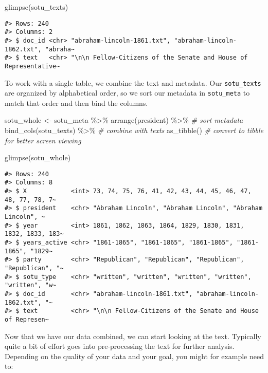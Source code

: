 \documentclass[
]{book}
\newenvironment{Shaded}{\begin{snugshade}}{\end{snugshade}}
\newcommand{\CommentTok}[1]{\textcolor[rgb]{0.56,0.35,0.01}{\textit{#1}}}
\newcommand{\FunctionTok}[1]{\textcolor[rgb]{0.00,0.00,0.00}{#1}}
\newcommand{\NormalTok}[1]{#1}
\newcommand{\OtherTok}[1]{\textcolor[rgb]{0.56,0.35,0.01}{#1}}
\newcommand{\SpecialCharTok}[1]{\textcolor[rgb]{0.00,0.00,0.00}{#1}}
\begin{document}
\begin{Shaded}
\begin{Highlighting}[]
\FunctionTok{glimpse}\NormalTok{(sotu\_texts)}
\end{Highlighting}
\end{Shaded}

\begin{verbatim}
#> Rows: 240
#> Columns: 2
#> $ doc_id <chr> "abraham-lincoln-1861.txt", "abraham-lincoln-1862.txt", "abraha~
#> $ text   <chr> "\n\n Fellow-Citizens of the Senate and House of Representative~
\end{verbatim}

To work with a single table, we combine the text and metadata. Our \texttt{sotu\_texts} are organized by alphabetical order, so we sort our metadata in \texttt{sotu\_meta} to match that order and then bind the columns.

\begin{Shaded}
\begin{Highlighting}[]
\NormalTok{sotu\_whole }\OtherTok{\textless{}{-}} 
\NormalTok{  sotu\_meta }\SpecialCharTok{\%\textgreater{}\%}  
  \FunctionTok{arrange}\NormalTok{(president) }\SpecialCharTok{\%\textgreater{}\%} \CommentTok{\# sort metadata}
  \FunctionTok{bind\_cols}\NormalTok{(sotu\_texts) }\SpecialCharTok{\%\textgreater{}\%} \CommentTok{\# combine with texts}
  \FunctionTok{as\_tibble}\NormalTok{() }\CommentTok{\# convert to tibble for better screen viewing}

\FunctionTok{glimpse}\NormalTok{(sotu\_whole)}
\end{Highlighting}
\end{Shaded}

\begin{verbatim}
#> Rows: 240
#> Columns: 8
#> $ X            <int> 73, 74, 75, 76, 41, 42, 43, 44, 45, 46, 47, 48, 77, 78, 7~
#> $ president    <chr> "Abraham Lincoln", "Abraham Lincoln", "Abraham Lincoln", ~
#> $ year         <int> 1861, 1862, 1863, 1864, 1829, 1830, 1831, 1832, 1833, 183~
#> $ years_active <chr> "1861-1865", "1861-1865", "1861-1865", "1861-1865", "1829~
#> $ party        <chr> "Republican", "Republican", "Republican", "Republican", "~
#> $ sotu_type    <chr> "written", "written", "written", "written", "written", "w~
#> $ doc_id       <chr> "abraham-lincoln-1861.txt", "abraham-lincoln-1862.txt", "~
#> $ text         <chr> "\n\n Fellow-Citizens of the Senate and House of Represen~
\end{verbatim}

Now that we have our data combined, we can start looking at the text. Typically quite a bit of effort goes into pre-processing the text for further analysis. Depending on the quality of your data and your goal, you might for example need to:
\end{document}
